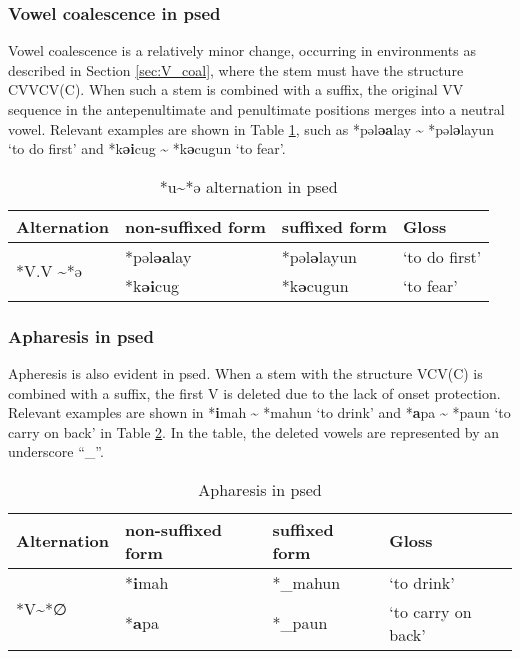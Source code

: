 \subsubsection{Vowel coalescence in \acl{psed}}

Vowel coalescence is a relatively minor change, occurring in environments as described in Section \ref{sec:V_coal}, where the stem must have the structure CVVCV(C). When such a stem is combined with a suffix, the original VV sequence in the antepenultimate and penultimate positions merges into a neutral vowel. Relevant examples are shown in Table \ref{tab:psed_VV2ə}, such as *pəl\textbf{əa}lay \~{} *pəl\textbf{ə}layun `to do first' and *k\textbf{əi}cug \~{} *k\textbf{ə}cugun `to fear'.

\begin{table}[!htbp]
\centering
\caption{*u\~{}*ə alternation in \acl{psed}}
\label{tab:psed_VV2ə}
\begin{tabular}{llll}
\hline
Alternation        & non-suffixed form    & suffixed form & Gloss     \\ \hline
\multirow{2}{*}{*V.V \~{ }*ə}  & *pəl\textbf{əa}lay & *pəl\textbf{ə}layun     & `to do first' \\ 
                               & *k\textbf{əi}cug   & *k\textbf{ə}cugun       & `to fear' \\ \hline
\end{tabular}
\end{table}

\subsubsection{Apharesis in \acl{psed}} %

Apheresis is also evident in \acl{psed}. When a stem with the structure VCV(C) is combined with a suffix, the first V is deleted due to the lack of onset protection. Relevant examples are shown in *\textbf{i}mah \~{} *mahun `to drink' and *\textbf{a}pa \~{} *paun `to carry on back' in Table \ref{tab:psed_V20}. In the table, the deleted vowels are represented by an underscore “\_{}”.

\begin{table}[!htbp]
\centering
\caption{Apharesis in \acl{psed}}
\label{tab:psed_V20}
\begin{tabular}{llll}
\hline
Alternation                & non-suffixed form    & suffixed form & Gloss     \\ \hline
\multirow{2}{*}{*V\~{ }*∅} & *\textbf{i}mah & *\_mahun     & `to drink' \\
                           & *\textbf{a}pa & *\_paun     & `to carry on back'   \\ \hline
\end{tabular}
\end{table}

